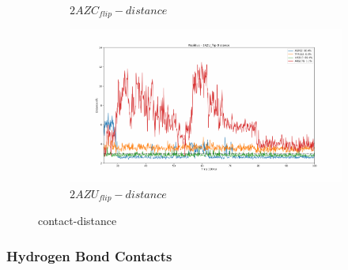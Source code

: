 \documentclass[fleqn,10pt]{wlscirep}
\begin{document}
\begin{figure}[!ht]
\begin{subfigure}{.45\textwidth}
     \caption{$2AZC_{flip}-distance$}
     \label{fig:2AZC_flip-dist}
   \end{subfigure}
    \begin{subfigure}{.45\textwidth}
     \centering
     \includegraphics[width=.95\linewidth]{2AZU_flip/2AZU_flip-dist_4.pdf}
     \caption{$2AZU_{flip}-distance$}
     \label{fig:2AZU_flip-dist}
   \end{subfigure}
\caption{contact-distance}
\label{fig:contact-distance}
\end{figure}  

\subsubsection{Hydrogen Bond Contacts}
\end{document}
